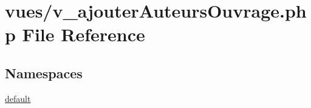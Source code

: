\hypertarget{v__ajouter_auteurs_ouvrage_8php}{}\section{vues/v\+\_\+ajouter\+Auteurs\+Ouvrage.php File Reference}
\label{v__ajouter_auteurs_ouvrage_8php}
\subsection*{Namespaces}
\begin{DoxyCompactItemize}
\item 
 \hyperlink{namespacedefault}{default}
\end{DoxyCompactItemize}
